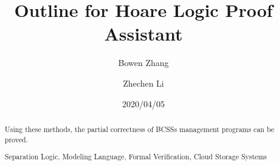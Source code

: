 \documentclass[runningheads,a4paper]{llncs}
\newcommand{\keywords}[1]{\par\addvspace\baselineskip
\noindent\keywordname\enspace\ignorespaces#1}
\begin{document}
	
	\mainmatter  %
	
	\title{Outline for Hoare Logic Proof Assistant}
	\date{2020/04/05}
	
	
	\author{Bowen Zhang \and Zhechen Li}
		
	
	
	
	\maketitle
	
	
	\begin{abstract}
	
		Using these methods, the partial correctness of BCSSs management programs can be proved.
		
		\keywords{Separation Logic, Modeling Language, Formal Verification, Cloud Storage Systems}
	
	\end{abstract}




\end{document}
